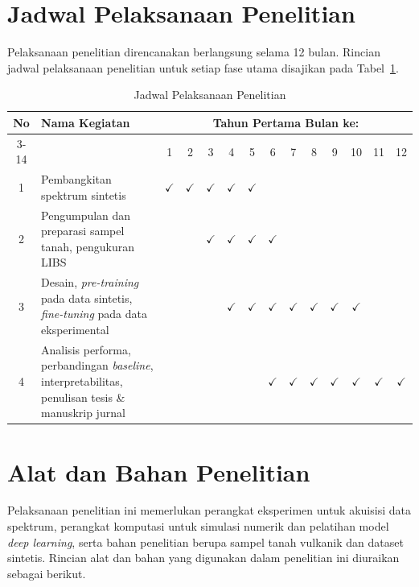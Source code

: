 \section{Jadwal Pelaksanaan Penelitian}
Pelaksanaan penelitian direncanakan berlangsung selama 12 bulan. Rincian jadwal pelaksanaan penelitian untuk setiap fase utama disajikan pada Tabel~\ref{tab:jadwal_penelitian}.

\begin{table}[H]
  \centering
  \caption{Jadwal Pelaksanaan Penelitian}
  \label{tab:jadwal_penelitian}
  \small
  \setlength{\tabcolsep}{4pt}
  \begin{tabular}{|c|p{4.2cm}|c|c|c|c|c|c|c|c|c|c|c|c|}
    \hline
    \multirow{2}{*}{No} & \multirow{2}{*}{Nama Kegiatan} &
      \multicolumn{12}{c|}{Tahun Pertama Bulan ke:} \\
    \cline{3-14}
    & & 1 & 2 & 3 & 4 & 5 & 6 & 7 & 8 & 9 & 10 & 11 & 12 \\
    \hline
    1 & Pembangkitan spektrum sintetis
      & $\checkmark$ & $\checkmark$ & $\checkmark$ & $\checkmark$ & $\checkmark$
      & & & & & & & \\
    \hline
    2 & Pengumpulan dan preparasi sampel tanah, pengukuran LIBS
      & & & $\checkmark$ & $\checkmark$ & $\checkmark$ & $\checkmark$
      & & & & & & \\
    \hline
    3 & Desain, \textit{pre-training} pada data sintetis, \textit{fine-tuning} pada data eksperimental
      & & & & $\checkmark$ & $\checkmark$ & $\checkmark$ & $\checkmark$
      & $\checkmark$ & $\checkmark$ & $\checkmark$ & & \\
    \hline
    4 & Analisis performa, perbandingan \textit{baseline}, interpretabilitas, penulisan tesis \& manuskrip jurnal
      & & & & & & $\checkmark$ & $\checkmark$ & $\checkmark$ & $\checkmark$
      & $\checkmark$ & $\checkmark$ & $\checkmark$ \\
    \hline
  \end{tabular}
\end{table}

\section{Alat dan Bahan Penelitian}

Pelaksanaan penelitian ini memerlukan perangkat eksperimen untuk akuisisi data spektrum, perangkat komputasi untuk simulasi numerik dan pelatihan model \textit{deep learning}, serta bahan penelitian berupa sampel tanah vulkanik dan dataset sintetis. Rincian alat dan bahan yang digunakan dalam penelitian ini diuraikan sebagai berikut.

